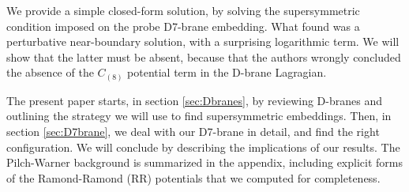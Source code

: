 We provide a simple closed-form solution, by solving the supersymmetric condition imposed on the probe D7-brane embedding. What \cite{Albash:2011nw} found was a perturbative near-boundary solution, with a surprising logarithmic term. We will show that the latter must be absent, because that the authors wrongly concluded the absence of the $C_{(8)}$ potential term in the D-brane Lagragian. 

The present paper starts, in section \ref{sec:Dbranes}, by reviewing D-branes and outlining the strategy we will use to find supersymmetric embeddings. Then, in section \ref{sec:D7brane}, we deal with our D7-brane in detail, and find the right configuration. We will conclude by describing the implications of our results. The Pilch-Warner background is summarized in the appendix, including explicit forms of the Ramond-Ramond (RR) potentials that we computed for completeness. 




